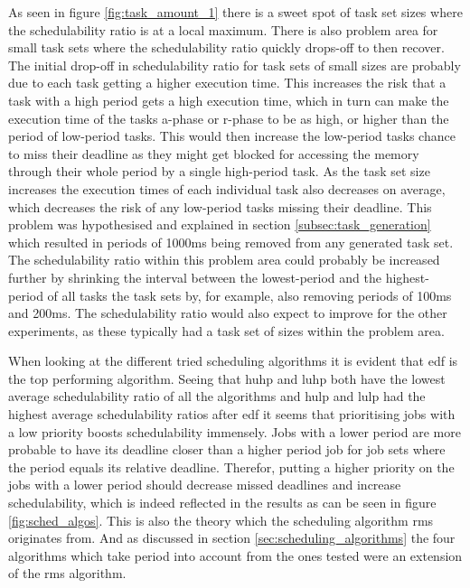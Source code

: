 \documentclass{kththesis}
\begin{document}
As seen in figure \ref{fig:task_amount_1} there is a sweet spot of task set sizes where the
schedulability ratio is at a local maximum. There is also problem area for small task sets where the
schedulability ratio quickly drops-off to then recover. The initial drop-off in schedulability ratio
for task sets of small sizes are probably due to each task getting a higher execution time. This
increases the risk that a task with a high period gets a high execution time, which in turn can
make the execution time of the tasks \acrshort{a}-phase or \acrshort{r}-phase to be as high,
or higher than the period of low-period tasks. This would then increase the low-period tasks chance
to miss their deadline as they might get blocked for accessing the memory through their whole period
by a single high-period task. As the task set size increases the execution times of each individual
task also decreases on average, which decreases the risk of any low-period tasks missing their
deadline. This problem was hypothesised and explained in section \ref{subsec:task_generation} which
resulted in periods of 1000ms being removed from any generated task set. The schedulability ratio
within this problem area could probably be increased further by shrinking the interval between the
lowest-period and the highest-period of all tasks the task sets by, for example, also removing
periods of 100ms and 200ms. The schedulability ratio would also expect to improve for the other
experiments, as these typically had a task set of sizes within the problem area.


When looking at the different tried scheduling algorithms it is evident that \acrshort{edf} is the
top performing algorithm. Seeing that \acrshort{huhp} and \acrshort{luhp} both have the lowest
average schedulability ratio of all the algorithms and \acrshort{hulp} and \acrshort{lulp} had the
highest average schedulability ratios after \acrshort{edf} it seems that prioritising jobs with a
low priority boosts schedulability immensely. Jobs with a lower period are more probable to have its
deadline closer than a higher period job for job sets where the period equals its relative deadline.
Therefor, putting a higher priority on the jobs with a lower period should decrease missed deadlines
and increase schedulability, which is indeed reflected in the results as can be seen in figure
\ref{fig:sched_algos}. This is also the theory which the scheduling algorithm \acrshort{rms}
originates from. And as discussed in section \ref{sec:scheduling_algorithms} the four algorithms
which take period into account from the ones tested were an extension of the \acrshort{rms}
algorithm. 
\end{document}
